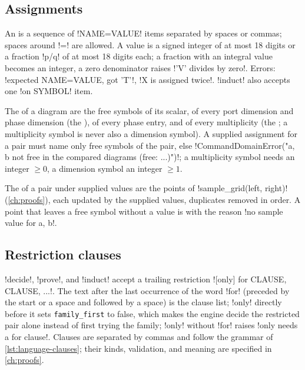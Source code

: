 \subsection{Assignments}

An  is a sequence of \code!NAME=VALUE! items separated by spaces or commas; spaces around \code!=! are allowed. A value is a signed integer of at most 18 digits or a fraction \code!p/q! of at most 18 digits each; a fraction with an integral value becomes an integer, a zero denominator raises \code!'V' divides by zero!. Errors: \code!expected NAME=VALUE, got 'T'!, \code!X is assigned twice!. \azx!induct! also accepts one \code!on SYMBOL! item.

\begin{definition}\label{def:language-supplied}
The  of a diagram are the free symbols of its scalar, of every port dimension and phase dimension (the ), of every phase entry, and of every \bbox{} multiplicity (the ; a multiplicity symbol is never also a dimension symbol). A supplied assignment for a pair must name only free symbols of the pair, else \code!CommandDomainError("a, b not free in the compared diagrams (free: ...)")!; a multiplicity symbol needs an integer $\ge0$, a dimension symbol an integer $\ge1$.
\end{definition}

\begin{definition}\label{def:language-samples}
The  of a pair under supplied values are the points of \py!sample_grid(left, right)! (\cref{ch:proofs}), each updated by the supplied values, duplicates removed in order. A point that leaves a free symbol without a value is  with the reason \code!no sample value for a, b!.
\end{definition}

\subsection{Restriction clauses}\label{sec:language-for}

\azx!decide!, \azx!prove!, and \azx!induct! accept a trailing restriction \code![only] for CLAUSE, CLAUSE, ...!. The text after the last occurrence of the word \code!for! (preceded by the start or a space and followed by a space) is the clause list; \code!only! directly before it sets \texttt{family\_first} to false, which makes the engine decide the restricted pair alone instead of first trying the family; \code!only! without \code!for! raises \code!only needs a for clause!. Clauses are separated by commas and follow the grammar of \cref{lst:language-clauses}; their kinds, validation, and meaning are specified in \cref{ch:proofs}.


